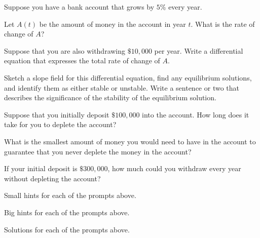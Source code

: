 \begin{activity} \label{A:6.7.finance}  
  Suppose you have a bank account that grows by $5$\% every year.

\ba
\item Let $A(t)$ be the amount of money in the account in year $t$.
  What is the rate of change of $A$?

\item Suppose that you are also withdrawing $\$10,000$ per year.  Write
  a differential equation that expresses the total rate of change of
  $A$. 

\item Sketch a slope field for this differential equation, find any
  equilibrium solutions, and identify them as either stable or
  unstable.  Write a sentence or two that describes the significance
  of the stability of the equilibrium solution.

\item Suppose that you initially deposit $\$100,000$ into the account.  How
  long does it take for you to deplete the account?

\item What is the smallest amount of money you would need to have in
  the account to guarantee that you never deplete the money in the
  account? 
\item If your initial deposit is $\$300,000$, how much could you
  withdraw every year without depleting the account?

\ea
\end{activity}
\begin{smallhint}
\ba
	\item Small hints for each of the prompts above.
\ea
\end{smallhint}
\begin{bighint}
\ba
	\item Big hints for each of the prompts above.
\ea
\end{bighint}
\begin{activitySolution}
\ba
	\item Solutions for each of the prompts above.
\ea
\end{activitySolution}
\aftera